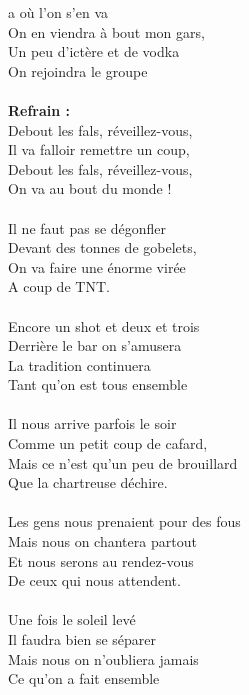 a
\vspace{-0.2cm}
 où l'on s'en va
\\On en viendra à bout mon gars,
\\Un peu d'ictère et de vodka
\\On rejoindra le groupe
\\\\\textbf{Refrain :}
\\Debout les fals, réveillez-vous,
\\Il va falloir remettre un coup,
\\Debout les fals, réveillez-vous,
\\On va au bout du monde !
\\\\Il ne faut pas se dégonfler
\\Devant des tonnes de gobelets,
\\On va faire une énorme virée
\\A coup de TNT.
\\\\Encore un shot et deux et trois
\\Derrière le bar on s'amusera
\\La tradition continuera
\\Tant qu'on est tous ensemble
\\\\Il nous arrive parfois le soir
\\Comme un petit coup de cafard,
\\Mais ce n'est qu'un peu de brouillard
\\Que la chartreuse déchire.
\\\\Les gens nous prenaient pour des fous
\\Mais nous on chantera partout
\\Et nous serons au rendez-vous
\\De ceux qui nous attendent.
\\\\Une fois le soleil levé
\\Il faudra bien se séparer
\\Mais nous on n'oubliera jamais
\\Ce qu'on a fait ensemble


\breakpage